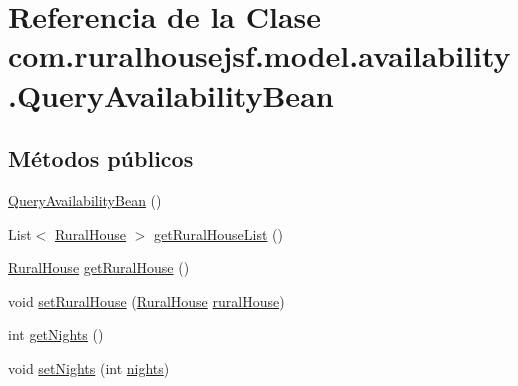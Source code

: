 \hypertarget{classcom_1_1ruralhousejsf_1_1model_1_1availability_1_1_query_availability_bean}{}\section{Referencia de la Clase com.\+ruralhousejsf.\+model.\+availability.\+Query\+Availability\+Bean}
\label{classcom_1_1ruralhousejsf_1_1model_1_1availability_1_1_query_availability_bean}
\subsection*{Métodos públicos}
\begin{DoxyCompactItemize}
\item 
\mbox{\hyperlink{classcom_1_1ruralhousejsf_1_1model_1_1availability_1_1_query_availability_bean_a774769b2abae9a936441fcb0221f3cde}{Query\+Availability\+Bean}} ()
\item 
List$<$ \mbox{\hyperlink{classcom_1_1ruralhousejsf_1_1domain_1_1_rural_house}{Rural\+House}} $>$ \mbox{\hyperlink{classcom_1_1ruralhousejsf_1_1model_1_1availability_1_1_query_availability_bean_ac3e48b7da4e958bb59c9c22d563249e2}{get\+Rural\+House\+List}} ()
\item 
\mbox{\hyperlink{classcom_1_1ruralhousejsf_1_1domain_1_1_rural_house}{Rural\+House}} \mbox{\hyperlink{classcom_1_1ruralhousejsf_1_1model_1_1availability_1_1_query_availability_bean_ad4f318a7cc2f3e1fd8577693c48c086d}{get\+Rural\+House}} ()
\item 
void \mbox{\hyperlink{classcom_1_1ruralhousejsf_1_1model_1_1availability_1_1_query_availability_bean_a0dfead1981002b06882aeeaac61b3102}{set\+Rural\+House}} (\mbox{\hyperlink{classcom_1_1ruralhousejsf_1_1domain_1_1_rural_house}{Rural\+House}} \mbox{\hyperlink{classcom_1_1ruralhousejsf_1_1model_1_1availability_1_1_query_availability_bean_af0ec1e1e555ba7aecce40e6b7afb35e9}{rural\+House}})
\item 
int \mbox{\hyperlink{classcom_1_1ruralhousejsf_1_1model_1_1availability_1_1_query_availability_bean_aa1f5ab5e45a1c5ccba0e3195bad30ffd}{get\+Nights}} ()
\item 
void \mbox{\hyperlink{classcom_1_1ruralhousejsf_1_1model_1_1availability_1_1_query_availability_bean_a7e2cb72e616081680ef73d3e0098cfb7}{set\+Nights}} (int \mbox{\hyperlink{classcom_1_1ruralhousejsf_1_1model_1_1availability_1_1_query_availability_bean_a4b06a08eab621f9fd6bf50ea4ae78a84}{nights}})

\end{DoxyCompactItemize}
